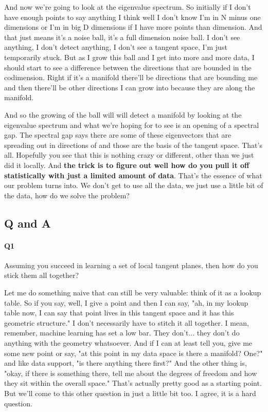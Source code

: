 And now we're going to look at the eigenvalue spectrum. So initially if I don't have enough points to say anything I think well I don't know I'm in N minus one dimensions or I'm in big D dimensions if I have more points than dimension. And that just means it's a noise ball, it's a full dimension noise ball. I don't see anything, I don't detect anything, I don't see a tangent space, I'm just temporarily stuck. But as I grow this ball and I get into more and more data, I should start to see a difference between the directions that are bounded in the codimension. Right if it's a manifold there'll be directions that are bounding me and then there'll be other directions I can grow into because they are along the manifold. 

And so the growing of the ball will will detect a manifold by looking at the eigenvalue spectrum and what we're hoping for to see is an opening of a spectral gap. The spectral gap says there are some of these eigenvectors that are spreading out in directions of and those are the basis of the tangent space. That's all. Hopefully you see that this is nothing crazy or different, other than we just did it locally. And \textbf{the trick is to figure out well how do you pull it off statistically with just a limited amount of data}. That's the essence of what our problem turns into. We don't get to use all the data, we just use a little bit of the data, how do we solve the problem? 


\subsection{Q and A}


\paragraph{Q1} Assuming you succeed in learning a set of local tangent planes, then how do you stick them all together?

Let me do something naive that can still be very valuable: think of it as a lookup table. So if you say, well, I give a point and then I can say, "ah, in my lookup table now, I can say that point lives in this tangent space and it has this geometric structure." I don't necessarily have to stitch it all together. I mean, remember, machine learning has set a low bar. They don't... they don't do anything with the geometry whatsoever. And if I can at least tell you, give me some new point or say, "at this point in my data space is there a manifold? One?" and like data support, "is there anything there first?" And the other thing is, "okay, if there is something there, tell me about the degrees of freedom and how they sit within the overall space." That's actually pretty good as a starting point. But we'll come to this other question in just a little bit too. I agree, it is a hard question.


